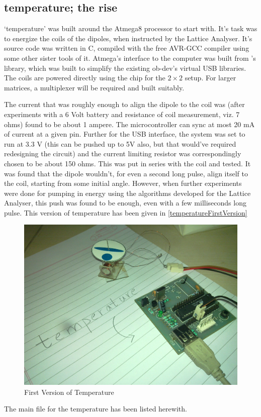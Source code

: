 	\subsection{temperature; the rise}
		`temperature' was built around the Atmega8 processor to start with. It's task was to energize the coils of the dipoles, when instructed by the Lattice Analyser. It's source code was written in C, compiled with the free AVR-GCC compiler using some other sister tools of it. Atmega's interface to the computer was built from \myProf's library, which was built to simplify the existing ob-dev's virtual USB libraries. The coils are powered directly using the chip for the $2\times 2$ setup. For larger matrices, a multiplexer will be required and built suitably.
		\par
		The current that was roughly enough to align the dipole to the coil was (after experiments with a 6 Volt battery and resistance of coil measurement, viz. 7 ohms) found to be about 1 ampere. The microcontroller can sync at most 20 mA of current at a given pin. Further for the USB interface, the system was set to run at 3.3 V (this can be pushed up to 5V also, but that would've required redesigning the circuit) and the current limiting resistor was correspondingly chosen to be about 150 ohms. This was put in series with the coil and tested. It was found that the dipole wouldn't, for even a second long pulse, align itself to the coil, starting from some initial angle. However, when further experiments were done for pumping in energy using the algorithms developed for the Lattice Analyser, this push was found to be enough, even with a few milliseconds long pulse. This version of temperature has been given in \autoref{temperatureFirstVersion}
		\par
		\begin{figure}[bth]
			\begin{center}
				\includegraphics[width=0.85\linewidth]{gfx/temperature.jpg}
			\end{center}
		\caption[First Version of Temperature]{First Version of Temperature}
		\label{temperatureFirstVersion}
		\end{figure}
		\par
		The main file for the temperature has been listed herewith.
				